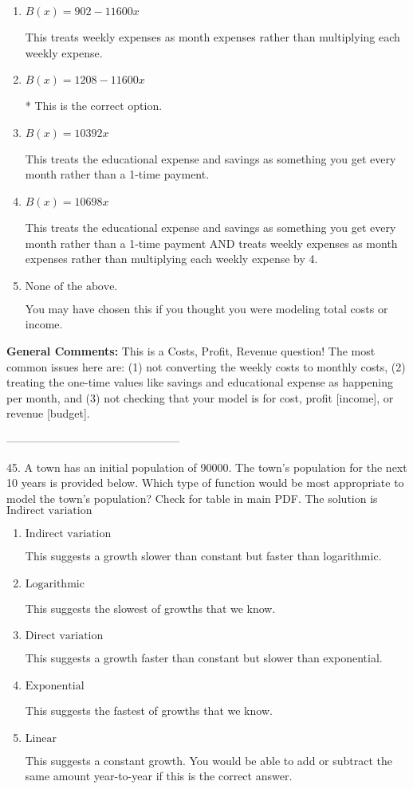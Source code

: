 \documentclass{article}[14pt]
\begin{document}
\begin{enumerate}[label=\Alph*.] 
\item $ B(x) = 902 - 11600 x $ 

 This treats weekly expenses as month expenses rather than multiplying each weekly expense. 
\item $ B(x) = 1208 - 11600 x $ 

 * This is the correct option. 
\item $ B(x) = 10392 x $ 

 This treats the educational expense and savings as something you get every month rather than a 1-time payment. 
\item $ B(x) = 10698 x $ 

 This treats the educational expense and savings as something you get every month rather than a 1-time payment AND treats weekly expenses as month expenses rather than multiplying each weekly expense by 4. 
\item $ \text{None of the above.} $ 

 You may have chosen this if you thought you were modeling total costs or income. 
\end{enumerate} 
 
\textbf{General Comments:} This is a Costs, Profit, Revenue question! The most common issues here are: (1) not converting the weekly costs to monthly costs, (2) treating the one-time values like savings and educational expense as happening per month, and (3) not checking that your model is for cost, profit [income], or revenue [budget].

-----------------------------------------------

45. A town has an initial population of 90000. The town's population for the next 10 years is provided below. Which type of function would be most appropriate to model the town's population?
Check for table in main PDF. 
The solution is $ \text{Indirect variation} $ 

\begin{enumerate}[label=\Alph*.] 
\item $ \text{Indirect variation} $ 

 This suggests a growth slower than constant but faster than logarithmic. 
\item $ \text{Logarithmic} $ 

 This suggests the slowest of growths that we know. 
\item $ \text{Direct variation} $ 

 This suggests a growth faster than constant but slower than exponential. 
\item $ \text{Exponential} $ 

 This suggests the fastest of growths that we know. 
\item $ \text{Linear} $ 

 This suggests a constant growth. You would be able to add or subtract the same amount year-to-year if this is the correct answer. 
\end{enumerate} 
 
\end{document}
